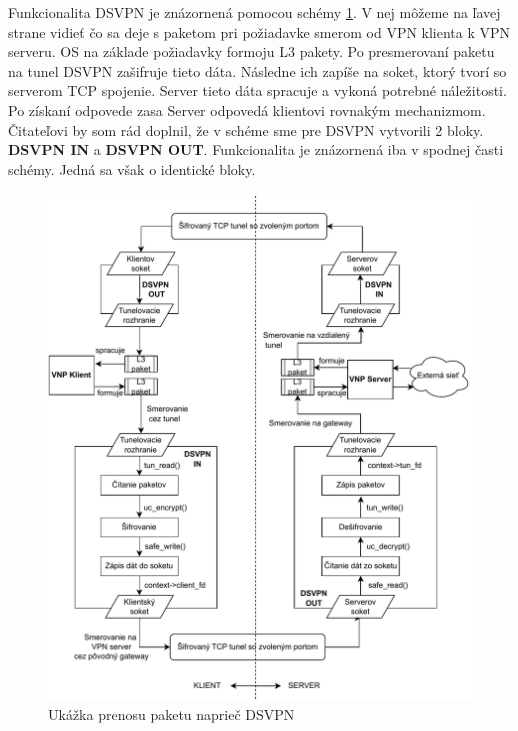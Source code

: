 Funkcionalita DSVPN je znázornená pomocou schémy \ref{dsvpnarch}. V nej môžeme na ľavej strane vidieť čo sa deje s paketom pri požiadavke smerom od VPN klienta k VPN serveru. OS na základe požiadavky formoju L3 pakety. Po presmerovaní paketu na tunel DSVPN zašifruje tieto dáta. Následne ich zapíše na soket, ktorý tvorí so serverom TCP spojenie. Server tieto dáta spracuje a vykoná potrebné náležitosti. Po získaní odpovede zasa Server odpovedá klientovi rovnakým mechanizmom. Čitateľovi by som rád doplnil, že v schéme sme pre DSVPN vytvorili 2 bloky. \textbf{DSVPN IN} a \textbf{DSVPN OUT}. Funkcionalita je znázornená iba v spodnej časti schémy. Jedná sa však o identické bloky.
\begin{figure}[h!]
	\centering
	\includegraphics[width=1.1\textwidth]{figures/dsvpn.pdf}
	\caption{Ukážka prenosu paketu naprieč DSVPN}
	\label{dsvpnarch}
\end{figure}


 
